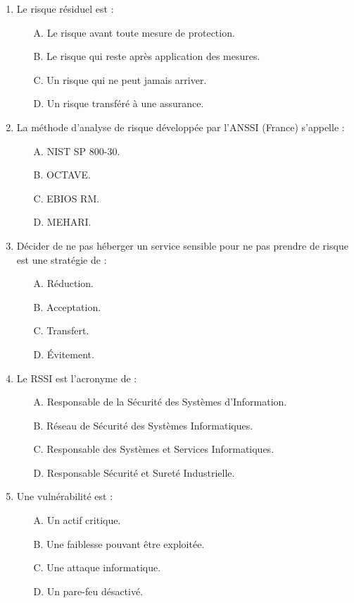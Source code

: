 \begin{enumerate}
    \item Le risque résiduel est :
    \begin{itemize}
        \item[A.] Le risque avant toute mesure de protection.
        \item[B.] Le risque qui reste après application des mesures.
        \item[C.] Un risque qui ne peut jamais arriver.
        \item[D.] Un risque transféré à une assurance.
    \end{itemize}

    \item La méthode d'analyse de risque développée par l'ANSSI (France) s'appelle :
    \begin{itemize}
        \item[A.] NIST SP 800-30.
        \item[B.] OCTAVE.
        \item[C.] EBIOS RM.
        \item[D.] MEHARI.
    \end{itemize}

    \item Décider de ne pas héberger un service sensible pour ne pas prendre de risque est une stratégie de :
    \begin{itemize}
        \item[A.] Réduction.
        \item[B.] Acceptation.
        \item[C.] Transfert.
        \item[D.] Évitement.
    \end{itemize}

    \item Le RSSI est l'acronyme de :
    \begin{itemize}
        \item[A.] Responsable de la Sécurité des Systèmes d'Information.
        \item[B.] Réseau de Sécurité des Systèmes Informatiques.
        \item[C.] Responsable des Systèmes et Services Informatiques.
        \item[D.] Responsable Sécurité et Sureté Industrielle.
    \end{itemize}

    \item Une vulnérabilité est :
    \begin{itemize}
        \item[A.] Un actif critique.
        \item[B.] Une faiblesse pouvant être exploitée.
        \item[C.] Une attaque informatique.
        \item[D.] Un pare-feu désactivé.
    \end{itemize}


\end{enumerate}
